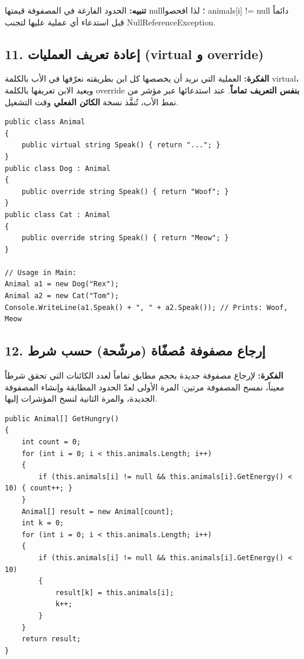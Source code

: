 \documentclass[14pt]{extarticle}
\begin{document}
\textbf{تنبيه:} الحدود الفارغة في المصفوفة قيمتها \textenglish{null}؛ لذا افحصوا \textenglish{animals[i] != null} دائماً قبل استدعاء أي عملية عليها لتجنب \textenglish{NullReferenceException}.

\filbreak
\subsection*{11. إعادة تعريف العمليات (\textenglish{virtual} و \textenglish{override})}
\textbf{الفكرة:} العملية التي نريد أن يخصصها كل ابن بطريقته نعرّفها في الأب بالكلمة \textenglish{virtual}، ويعيد الابن تعريفها بالكلمة \textenglish{override} \textbf{بنفس التعريف تماماً}. عند استدعائها عبر مؤشر من نمط الأب، تُنفَّذ نسخة \textbf{الكائن الفعلي} وقت التشغيل.

\begin{boxCode}
\begin{english}
\begin{verbatim}
public class Animal
{
    public virtual string Speak() { return "..."; }
}
public class Dog : Animal
{
    public override string Speak() { return "Woof"; }
}
public class Cat : Animal
{
    public override string Speak() { return "Meow"; }
}

// Usage in Main:
Animal a1 = new Dog("Rex");
Animal a2 = new Cat("Tom");
Console.WriteLine(a1.Speak() + ", " + a2.Speak()); // Prints: Woof, Meow
\end{verbatim}
\end{english}
\end{boxCode}

\filbreak
\subsection*{12. إرجاع مصفوفة مُصفّاة (مرشّحة) حسب شرط}
\textbf{الفكرة:} لإرجاع مصفوفة جديدة بحجم مطابق تماماً لعدد الكائنات التي تحقق شرطاً معيناً، نمسح المصفوفة مرتين: المرة الأولى لعدّ الحدود المطابقة وإنشاء المصفوفة الجديدة، والمرة الثانية لنسخ المؤشرات إليها.

\begin{boxCode}
\begin{english}
\begin{verbatim}
public Animal[] GetHungry()
{
    int count = 0;
    for (int i = 0; i < this.animals.Length; i++)
    {
        if (this.animals[i] != null && this.animals[i].GetEnergy() < 10) { count++; }
    }
    Animal[] result = new Animal[count];
    int k = 0;
    for (int i = 0; i < this.animals.Length; i++)
    {
        if (this.animals[i] != null && this.animals[i].GetEnergy() < 10)
        {
            result[k] = this.animals[i];
            k++;
        }
    }
    return result;
}
\end{verbatim}
\end{english}
\end{boxCode}
\end{document}
